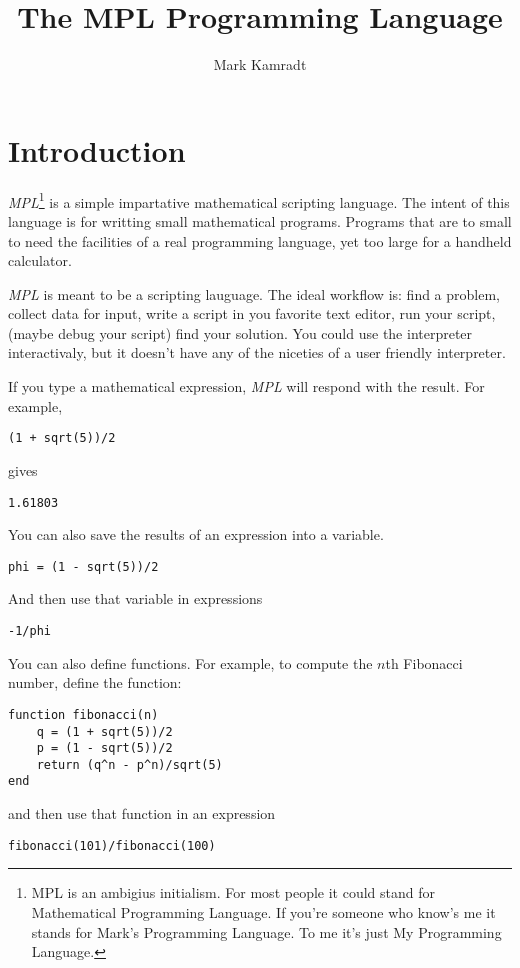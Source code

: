 \documentclass{article}
\begin{document}
\title{The MPL Programming Language}
\author{Mark Kamradt}
\maketitle
\section{Introduction}
\emph{MPL}\footnote{MPL is an ambigius initialism.
  For most people it could stand for Mathematical Programming Language.
  If you're someone who know's me it stands for Mark's Programming Language.
  To me it's just My Programming Language.}
is a simple impartative mathematical scripting language.
The intent of this language is for writting small mathematical programs.
Programs that are to small to need the facilities of a real programming
language, yet too large for a handheld calculator.

\emph{MPL} is meant to be a scripting lauguage.
The ideal workflow is: find a problem, collect data for input,
write a script in you favorite text editor, run your script,
(maybe debug your script) find your solution.
You could use the interpreter interactivaly, but it doesn't have
any of the niceties of a user friendly interpreter.

If you type a mathematical expression, \emph{MPL} will respond with
the result.  For example,
\begin{verbatim}
(1 + sqrt(5))/2
\end{verbatim}
gives
\begin{verbatim}
1.61803
\end{verbatim}

You can also save the results of an expression into a variable.
\begin{verbatim}
phi = (1 - sqrt(5))/2
\end{verbatim}
And then use that variable in expressions
\begin{verbatim}
-1/phi
\end{verbatim}

You can also define functions. For example, to compute the $n$th Fibonacci
number, define the function:
\begin{verbatim}
function fibonacci(n)
    q = (1 + sqrt(5))/2
    p = (1 - sqrt(5))/2
    return (q^n - p^n)/sqrt(5)
end
\end{verbatim}
and then use that function in an expression
\begin{verbatim}
fibonacci(101)/fibonacci(100)
\end{verbatim}
\end{document}
